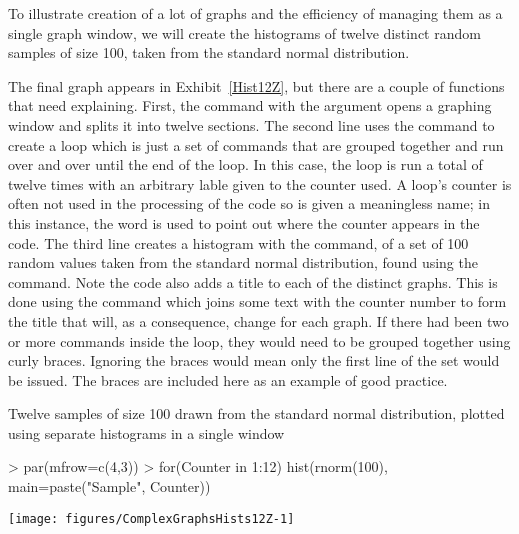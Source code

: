 To illustrate creation of a lot of graphs and the efficiency of managing them as a single graph window, we will create the histograms of twelve distinct random samples of size 100, taken from the standard normal distribution. 
 
The final graph appears in Exhibit~\ref{Hist12Z}, but there are a couple of functions that need explaining. First, the  command with the  argument opens a graphing window and splits it into twelve sections. The second line uses the  command to create a loop which is just a set of commands that are grouped together and run over and over until the end of the loop. In this case, the loop is run a total of twelve times with an arbitrary lable given to the counter used. A loop's counter is often not used in the processing of the code so is given a meaningless name; in this instance, the word  is used to point out where the counter appears in the code. The third line creates a histogram with the  command, of a set of 100 random values taken from the standard normal distribution, found using the  command. Note the code also adds a title to each of the distinct graphs. This is done using the  command which joins some text with the counter number to form the title that will, as a consequence, change for each graph. If there had been two or more commands inside the loop, they would need to be grouped together using curly braces. Ignoring the braces would mean only the first line of the set would be issued. The braces are included here as an example of good practice. 
 
\begin{exhibit} 
\begin{center} 
\caption{Twelve samples of size 100 drawn from the standard normal distribution, plotted using separate histograms in a single window} 
\label{Hists12Z} 

\begin{Schunk}
\begin{Sinput}
> par(mfrow=c(4,3)) 
> for(Counter in 1:12){ 
   hist(rnorm(100), main=paste("Sample", Counter))} 
\end{Sinput}

\texttt{[image: figures/ComplexGraphsHists12Z-1]} \end{Schunk}

\end{center} 
\end{exhibit} 
 

